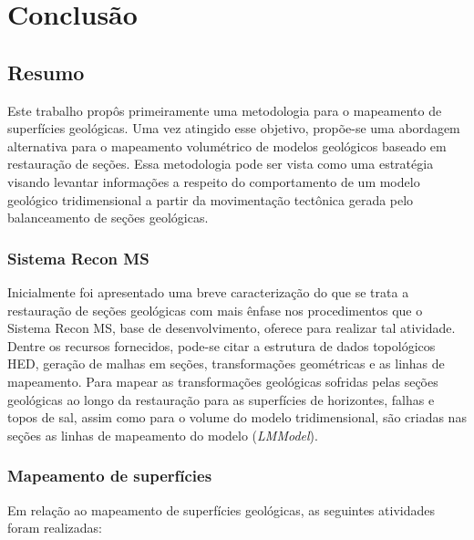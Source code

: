 
\chapter{Conclusão}

\section{Resumo}

Este trabalho propôs primeiramente uma metodologia para o mapeamento de superfícies geológicas. Uma vez atingido esse objetivo, propõe-se uma abordagem alternativa para o mapeamento volumétrico de modelos geológicos baseado em restauração de seções. Essa metodologia pode ser vista como uma estratégia visando levantar informações a respeito do comportamento de um modelo geológico tridimensional a partir da movimentação tectônica gerada pelo balanceamento de seções geológicas.

\subsection*{Sistema Recon MS}

Inicialmente foi apresentado uma breve caracterização do que se trata a restauração de seções geológicas com mais ênfase nos procedimentos que o Sistema Recon MS, base de desenvolvimento, oferece para realizar tal atividade. Dentre os recursos fornecidos, pode-se citar a estrutura de dados topológicos HED, geração de malhas em seções, transformações geométricas e as linhas de mapeamento. Para mapear as transformações geológicas sofridas pelas seções geológicas ao longo da restauração para as superfícies de horizontes, falhas e topos de sal, assim como para o volume do modelo tridimensional, são criadas nas seções as linhas de mapeamento do modelo (\emph{LMModel}). 

\subsection*{Mapeamento de superfícies}

Em relação ao mapeamento de superfícies geológicas, as seguintes atividades foram realizadas:

